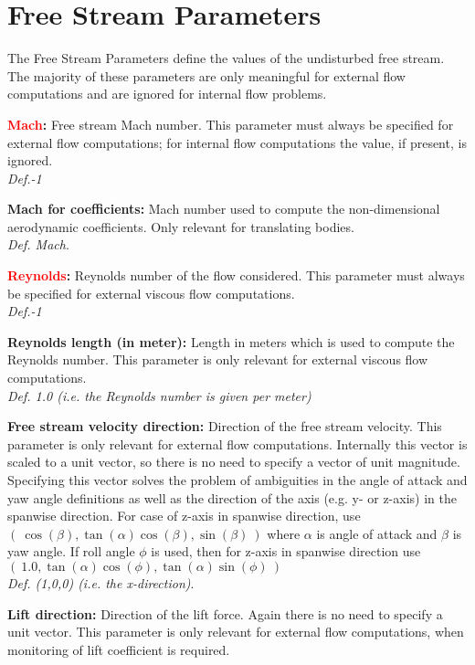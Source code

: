 \documentclass[12pt,epsf,colordvi]{article}
\begin{document}
\section{ Free Stream Parameters}
%
The Free Stream Parameters define the values of the undisturbed free stream. The majority of these parameters are only meaningful for external flow computations and are ignored for internal flow problems. 
%
\begin{description}
%
      \item{\bf  \textcolor{red}{ Mach}:} Free stream Mach number. This parameter must always be specified for external flow computations; for internal flow computations the value, if present, is ignored. \\
{\it Def.-1}
%
    \item{\bf   Mach for coefficients:} Mach number used to compute the non-dimensional aerodynamic coefficients. Only relevant for translating bodies. \\
	{\it Def.  Mach}.
%
     \item{\bf  \textcolor{red}{Reynolds}:} Reynolds number of the flow considered. This parameter must always be specified for external viscous flow computations. \\
{\it Def.-1}
%
     \item{\bf Reynolds length (in meter):} Length in meters which is used to compute the Reynolds number.  This parameter is only relevant for external viscous flow computations. \\
{\it Def. 1.0 (i.e. the Reynolds number is given per meter)}
%
     \item{\bf Free stream velocity direction:} Direction of the free stream velocity.  This parameter is only relevant for external flow computations. Internally this vector is scaled to a unit vector, so there is no need to specify a vector of unit magnitude. Specifying this vector solves the problem of ambiguities in the angle of attack and yaw angle definitions as well as the direction of the axis (e.g. y- or z-axis) in the spanwise direction. For case of z-axis in spanwise direction, use \( ( \  \cos (\beta) , \tan(\alpha) \cos (\beta) , \sin (\beta) \  )\)  where  \(\alpha \) is angle of attack and \(\beta\) is yaw angle. If roll angle \(\phi\) is used, then for z-axis in spanwise direction use \( ( \  1.0 , \tan(\alpha) \cos (\phi) , \tan(\alpha)\sin (\phi) \  )\)   \\
{\it Def. (1,0,0) (i.e. the x-direction)}.
%
     \item{\bf Lift direction:}  Direction of the lift force.  Again there is no need to specify a unit vector. This parameter is only relevant for external flow computations, when monitoring of lift coefficient is required. \\

\end{description}
\end{document}

